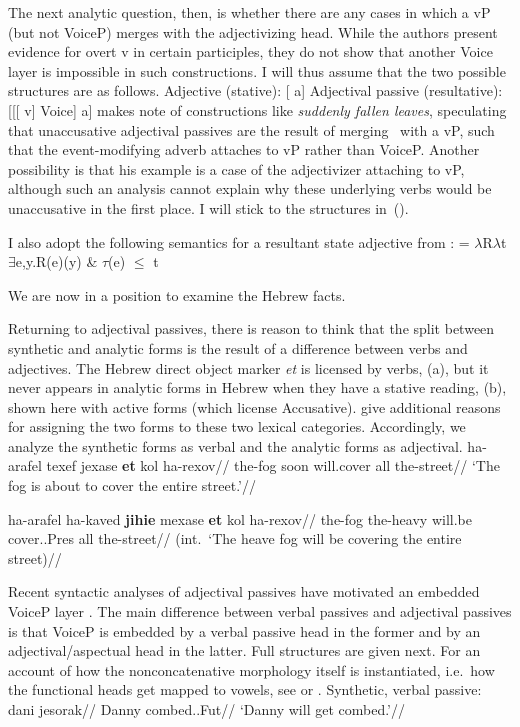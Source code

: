 The next analytic question, then, is whether there are any cases in which a vP (but not VoiceP) merges with the adjectivizing head. While the authors present evidence for overt v in certain participles, they do not show that another Voice layer is impossible in such constructions. I will thus assume that the two possible structures are as follows.
\pex
	\a Adjective (stative): {[} a]
	\a Adjectival passive (resultative): {[}[[ v] Voice] a]
\xe
\citet[391]{bruening14nllt} makes note of constructions like \emph{suddenly fallen leaves}, speculating that unaccusative adjectival passives are the result of merging \vz~with a vP, such that the event-modifying adverb attaches to vP rather than VoiceP. Another possibility is that his example is a case of the adjectivizer attaching to vP, although such an analysis cannot explain why these underlying verbs would be unaccusative in the first place. I will stick to the structures in~(\lastx).

I also adopt the following semantics for a resultant state adjective from \cite{kratzer00bls}:
\ex {} = $\lambda$R$\lambda$t$\exists$e,y.R(e)(y) \& $\tau$(e) $\le$ t
\xe

We are now in a position to examine the Hebrew facts.



Returning to adjectival passives, there is reason to think that the split between synthetic and analytic forms is the result of a difference between verbs and adjectives. The Hebrew direct object marker \emph{et} is licensed by verbs, (\nextx a), but it never appears in analytic forms in Hebrew when they have a stative reading, (\nextx b), shown here with active forms (which license Accusative). \cite{horvathsiloni08} give additional reasons for assigning the two forms to these two lexical categories. Accordingly, we analyze the synthetic forms as verbal and the analytic forms as adjectival.
\pex
	\a \begingl
		\gla ha-arafel texef jexase \textbf{et} kol ha-rexov//
		\glb the-fog soon will.cover  all the-street//
		\glft `The fog is about to cover the entire street.'//
		\endgl
	
	\a \ljudge{*}
		\begingl
		\gla ha-arafel ha-kaved \textbf{jihie} mexase \textbf{et} kol ha-rexov//
		\glb the-fog the-heavy will.be cover..Pres  all the-street//
		\glft (int.~`The heave fog will be covering the entire street)//
		\endgl
\xe

Recent syntactic analyses of adjectival passives have motivated an embedded VoiceP layer \citep{mcintyre13,alexiadouetal14,bruening14nllt,doron14adj}.
The main difference between verbal passives and adjectival passives is that VoiceP is embedded by a verbal passive head in the former and by an adjectival/aspectual head in the latter. Full structures are given next. For an account of how the nonconcatenative morphology itself is instantiated, i.e.~how the functional heads get mapped to vowels, see \cite{tucker15roots} or \cite{kastner16nllt}.
\pex\label{ex:heb-synth}Synthetic, verbal passive:
    \a \begingl
        \gla dani jesorak//
        \glb Danny combed..Fut//
        \glft `Danny will get combed.'//
    \endgl
    
